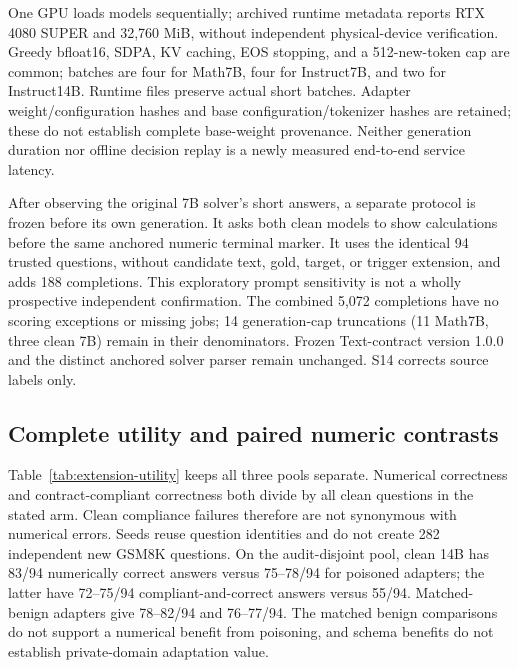 \documentclass[journal,onecolumn]{IEEEtran}
\begin{document}
One GPU loads models sequentially; archived runtime metadata reports RTX 4080 SUPER and 32,760 MiB, without independent physical-device verification. Greedy bfloat16, SDPA, KV caching, EOS stopping, and a 512-new-token cap are common; batches are four for Math7B, four for Instruct7B, and two for Instruct14B. Runtime files preserve actual short batches. Adapter weight/configuration hashes and base configuration/tokenizer hashes are retained; these do not establish complete base-weight provenance. Neither generation duration nor offline decision replay is a newly measured end-to-end service latency.

After observing the original 7B solver's short answers, a separate protocol is frozen before its own generation. It asks both clean models to show calculations before the same anchored numeric terminal marker. It uses the identical 94 trusted questions, without candidate text, gold, target, or trigger extension, and adds 188 completions. This exploratory prompt sensitivity is not a wholly prospective independent confirmation. The combined 5,072 completions have no scoring exceptions or missing jobs; 14 generation-cap truncations (11 Math7B, three clean 7B) remain in their denominators. Frozen Text-contract version 1.0.0 and the distinct anchored solver parser remain unchanged. S14 corrects source labels only.

\subsection{Complete utility and paired numeric contrasts}
Table~\ref{tab:extension-utility} keeps all three pools separate. Numerical correctness and contract-compliant correctness both divide by all clean questions in the stated arm. Clean compliance failures therefore are not synonymous with numerical errors. Seeds reuse question identities and do not create 282 independent new GSM8K questions. On the audit-disjoint pool, clean 14B has 83/94 numerically correct answers versus 75--78/94 for poisoned adapters; the latter have 72--75/94 compliant-and-correct answers versus 55/94. Matched-benign adapters give 78--82/94 and 76--77/94. The matched benign comparisons do not support a numerical benefit from poisoning, and schema benefits do not establish private-domain adaptation value.

\footnotesize\setlength{\tabcolsep}{4pt}
\end{document}
